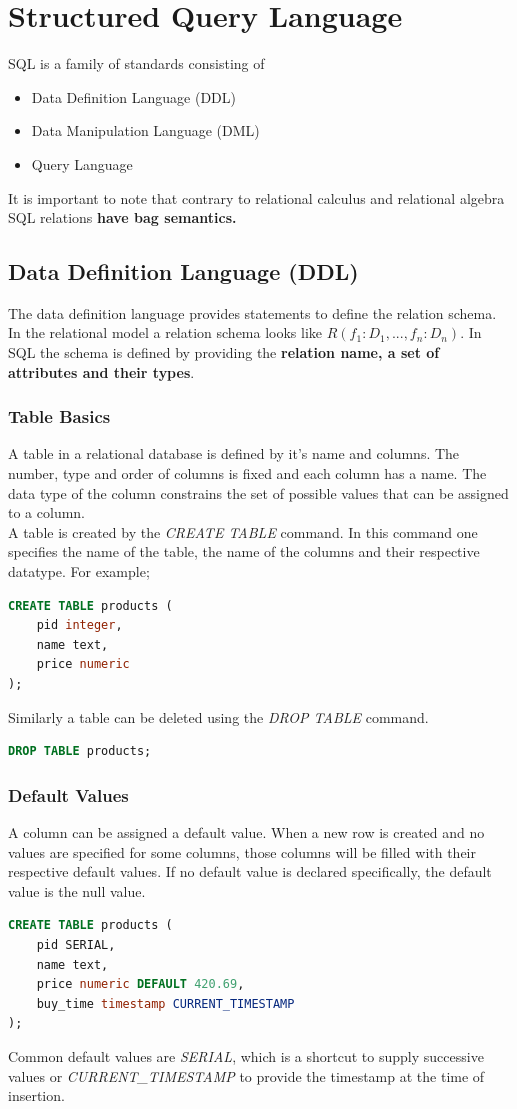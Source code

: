 \section{Structured Query Language}
SQL is a family of standards consisting of
\begin{itemize}
\item Data Definition Language (DDL)
\item Data Manipulation Language (DML)
\item Query Language
\end{itemize}
It is important to note that contrary to relational calculus and relational algebra SQL relations \textbf{have bag semantics.}

\subsection{Data Definition Language (DDL)}
The data definition language provides statements to define the relation schema. In the relational model a relation schema looks like $R(f_1 : D_1, ..., f_n : D_n)$. In SQL the schema is defined by providing the \textbf{relation name, a set of attributes and their types}.

\subsubsection{Table Basics}
A table in a relational database is defined by it's name and columns. The number, type and order of columns is fixed and each column has a name. The data type of the column constrains the set of possible values that can be assigned to a column. \\
A table is created by the \textit{CREATE TABLE} command. In this command one specifies the name of the table, the name of the columns and their respective datatype. For example;
\begin{lstlisting}[language=SQL] 
CREATE TABLE products (
	pid integer,
	name text,
	price numeric
);
\end{lstlisting}
Similarly a table can be deleted using the \textit{DROP TABLE} command.
\begin{lstlisting}[language=SQL]
DROP TABLE products;
\end{lstlisting}

\subsubsection{Default Values}
A column can be assigned a default value. When a new row is created and no values are specified for some columns, those columns will be filled with their respective default values. If no default value is declared specifically, the default value is the null value.
\begin{lstlisting}[language=SQL]
CREATE TABLE products (
	pid SERIAL,
	name text,
	price numeric DEFAULT 420.69,
	buy_time timestamp CURRENT_TIMESTAMP
);
\end{lstlisting}
Common default values are \textit{SERIAL}, which is a shortcut to supply successive values or \textit{CURRENT\_TIMESTAMP} to provide the timestamp at the time of insertion.

